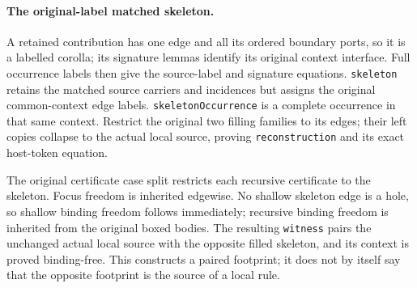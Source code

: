 \par{}
\par{}

\paragraph{The original-label matched skeleton.}
A retained contribution has one edge and all its ordered boundary ports,
so it is a labelled corolla; its signature lemmas identify its original
context interface. Full occurrence labels then give the source-label and
signature equations. \texttt{skeleton} retains the matched source carriers
and incidences but assigns the original common-context edge labels.
\texttt{skeletonOccurrence} is a complete occurrence in that same context.
Restrict the original two filling families to its edges; their left copies
collapse to the actual local source, proving \texttt{reconstruction} and
its exact host-token equation.

The original certificate case split restricts each recursive certificate
to the skeleton. Focus freedom is inherited edgewise. No shallow skeleton
edge is a hole, so shallow binding freedom follows immediately; recursive
binding freedom is inherited from the original boxed bodies. The resulting
\texttt{witness} pairs the unchanged actual local source with the opposite
filled skeleton, and its context is proved binding-free. This constructs
a paired footprint; it does not by itself say that the opposite footprint
is the source of a local rule.

